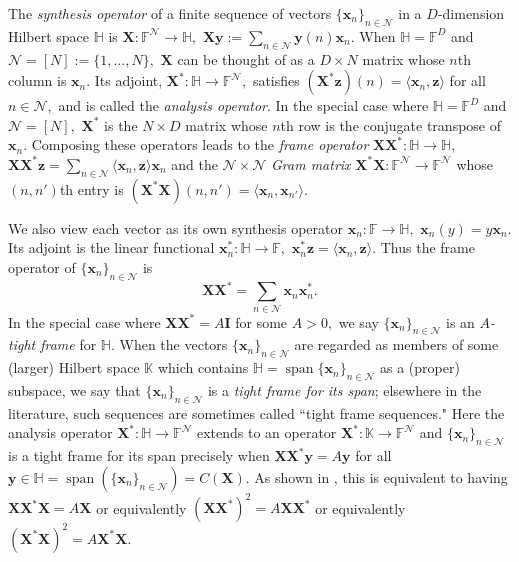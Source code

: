 \documentclass[3p,11pt]{elsarticle}
\newcommand{\bbF}{\mathbb{F}}
\newcommand{\bbH}{\mathbb{H}}
\newcommand{\bbK}{\mathbb{K}}
\newcommand{\bfI}{\mathbf{I}}
\newcommand{\bfx}{\mathbf{x}}
\newcommand{\bfX}{\mathbf{X}}
\newcommand{\bfy}{\mathbf{y}}
\newcommand{\bfz}{\mathbf{z}}
\newcommand{\calN}{\mathcal{N}}
\newcommand{\Span}{\operatorname{span}}
\newcommand{\ip}[2]{\langle{#1},{#2}\rangle}
\theoremstyle{definition}
\begin{document}
The \textit{synthesis operator} of a finite sequence of vectors $\{\bfx_n\}_{n\in\calN}$ in a $D$-dimension Hilbert space $\bbH$ is $\bfX:\bbF^\calN\to\bbH,$ $\bfX\bfy:=\sum_{n\in\calN}\bfy(n)\bfx_n.$ When $\bbH=\bbF^D$ and $\calN=[N]:=\{1,...,N\},$ $\bfX$ can be thought of as a $D\times N$ matrix whose $n$th column is $\bfx_n.$ Its adjoint, $\bfX^*:\bbH\to\bbF^\calN,$ satisfies $(\bfX^*\bfz)(n)=\ip{\bfx_n}{\bfz}$ for all $n\in\calN,$ and is called the \textit{analysis operator}. In the special case where $\bbH=\bbF^D$ and $\calN=[N],$ $\bfX^*$ is the $N\times D$ matrix whose $n$th row is the conjugate transpose of $\bfx_n.$ Composing these operators leads to the \textit{frame operator} $\bfX\bfX^*:\bbH\to\bbH,$ $\bfX\bfX^*\bfz=\sum_{n\in\calN}\ip{\bfx_n}{\bfz}\bfx_n$ and the $\calN\times\calN$ \textit{Gram matrix} $\bfX^*\bfX:\bbF^\calN\to\bbF^\calN$ whose $(n,n')$th entry is $(\bfX^*\bfX)(n,n')=\ip{\bfx_n}{\bfx_{n'}}.$

We also view each vector as its own synthesis operator $\bfx_n:\bbF\to\bbH,$ $\bfx_n(y)=y\bfx_n.$ Its adjoint is the linear functional $\bfx_n^*:\bbH\to\bbF,$ $\bfx_n^*\bfz=\ip{\bfx_n}{\bfz}.$ Thus the frame operator of $\{\bfx_n\}_{n\in\calN}$ is \begin{equation}
    \bfX\bfX^*=\sum_{n\in\calN}\bfx_n^{}\bfx_n^*.
\end{equation} 
In the special case where $\bfX\bfX^*=A\bfI$ for some $A>0,$ we say $\{\bfx_n\}_{n\in\calN}$ is an \textit{$A$-tight frame} for $\bbH.$ When the vectors $\{\bfx_n\}_{n\in\calN}$ are regarded as members of some (larger) Hilbert space $\bbK$ which contains $\bbH=\Span\{\bfx_n\}_{n\in\calN}$ as a (proper) subspace, we say that $\{\bfx_n\}_{n\in\calN}$ is a \textit{tight frame for its span}; elsewhere in the literature, such sequences are sometimes called ``tight frame sequences." Here the analysis operator $\bfX^*:\bbH\to\bbF^\calN$ extends to an operator $\bfX^*:\bbK\to\bbF^\calN$ and $\{\bfx_n\}_{n\in\calN}$ is a tight frame for its span precisely when $\bfX\bfX^*\bfy=A\bfy$ for all $\bfy\in\bbH=\Span(\{\bfx_n\}_{n\in\calN})=C(\bfX).$  As shown in \cite{FickusJKM18}, this is equivalent to having $\bfX\bfX^*\bfX=A\bfX$ or equivalently $(\bfX\bfX^*)^2=A\bfX\bfX^*$ or equivalently $(\bfX^*\bfX)^2=A\bfX^*\bfX.$
\end{document}

